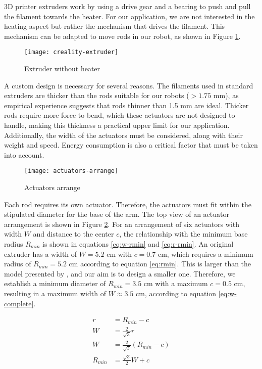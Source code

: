 3D printer extruders work by using a drive gear and a bearing to push and pull the filament towards the heater. For our application, we are not interested in the heating aspect but rather the mechanism that drives the filament. This mechanism can be adapted to move rods in our robot, as shown in Figure \ref{fig:extruder-wo-heater}.

\begin{figure}[H]
    \centering
    \texttt{[image: creality-extruder]}
    \caption{Extruder without heater}
    \label{fig:extruder-wo-heater}
\end{figure}

A custom design is necessary for several reasons. The filaments used in standard extruders are thicker than the rods suitable for our robots ($>1.75$ mm), as empirical experience suggests that rods thinner than 1.5 mm are ideal. Thicker rods require more force to bend, which these actuators are not designed to handle, making this thickness a practical upper limit for our application. Additionally, the width of the actuators must be considered, along with their weight and speed. Energy consumption is also a critical factor that must be taken into account.

\begin{figure}[H]
    \centering
    \texttt{[image: actuators-arrange]}
    \caption{Actuators arrange}
    \label{fig:actuators-arrange}
\end{figure}

Each rod requires its own actuator. Therefore, the actuators must fit within the stipulated diameter for the base of the arm. The top view of an actuator arrangement is shown in Figure \ref{fig:actuators-arrange}. For an arrangement of six actuators with width $W$ and distance to the center $c$, the relationship with the minimum base radius $R_{min}$ is shown in equations \ref{eq:w-rmin} and \ref{eq:r-rmin}. An original extruder has a width of $W=5.2$ cm with $c=0.7$ cm, which requires a minimum radius of $R_{min}=5.2$ cm according to equation \ref{eq:rmin}. This is larger than the model presented by \cite{wu2022}, and our aim is to design a smaller one. Therefore, we establish a minimum diameter of $R_{min}=3.5$ cm with a maximum $c=0.5$ cm, resulting in a maximum width of $W\approx3.5$ cm, according to equation \ref{eq:w-complete}.


\begin{align}
    \label{eq:r-rmin}
    r&=R_{min}-c\\
    \label{eq:w-rmin}
    W&=\frac{2}{\sqrt{3}}r\\
    \label{eq:w-complete}
    W&=\frac{2}{\sqrt{3}}(R_{min}-c)\\
    \label{eq:rmin}
    R_{min}&=\frac{\sqrt{3}}{2}W+c
\end{align}


